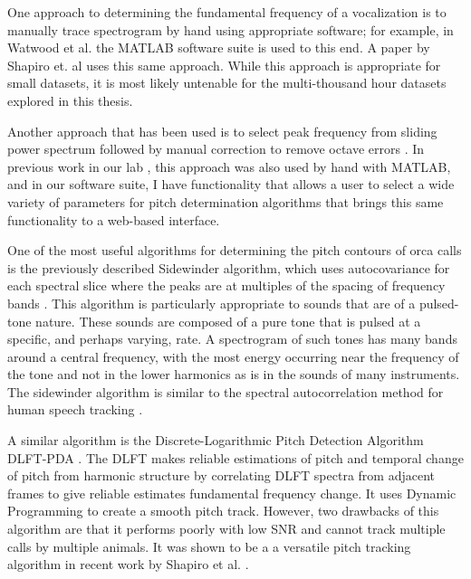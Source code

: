 One approach to determining the fundamental frequency of a
vocalization is to manually trace spectrogram by hand using
appropriate software; for example, in Watwood et
al. \cite{watson2004biodiversity} the MATLAB software suite is used to
this end.  A paper by Shapiro et. al
\cite{shapiro2006signature} uses this same approach.  While this
approach is appropriate for small datasets, it is most likely
untenable for the multi-thousand hour datasets explored in this
thesis.

Another approach that has been used is to select peak frequency from
sliding power spectrum followed by manual correction to remove octave
errors \cite{buck1993quantitative} \cite{janik1994signature}.  In
previous work in our lab \cite{ness2008chants}, this approach was also
used by hand with MATLAB, and in our software suite, I have
functionality that allows a user to select a wide variety of
parameters for pitch determination algorithms that brings this same
functionality to a web-based interface.

One of the most useful algorithms for determining the pitch contours
of orca calls is the previously described Sidewinder algorithm, which
uses autocovariance for each spectral slice where the peaks are at
multiples of the spacing of frequency bands
\cite{deecke1999quantifying}.  This algorithm is particularly
appropriate to sounds that are of a pulsed-tone nature.  These sounds
are composed of a pure tone that is pulsed at a specific, and perhaps
varying, rate.  A spectrogram of such tones has many bands
\cite{watkins1967harmonic} around a central frequency, with the most
energy occurring near the frequency of the tone and not in the lower
harmonics as is in the sounds of many instruments.  The sidewinder
algorithm is similar to the spectral autocorrelation method for human
speech tracking \cite{lahat1987autocorrelation}.

A similar algorithm is the Discrete-Logarithmic Pitch Detection
Algorithm DLFT-PDA \cite{wang2000pitch}.  The DLFT makes reliable
estimations of pitch and temporal change of pitch from harmonic
structure by correlating DLFT spectra from adjacent frames to give
reliable estimates fundamental frequency change.  It uses Dynamic
Programming to create a smooth pitch track.  However, two drawbacks of
this algorithm are that it performs poorly with low SNR and cannot
track multiple calls by multiple animals.  It was shown to be a a
versatile pitch tracking algorithm in recent work by Shapiro et
al. \cite{shapiro2009pitch}.

